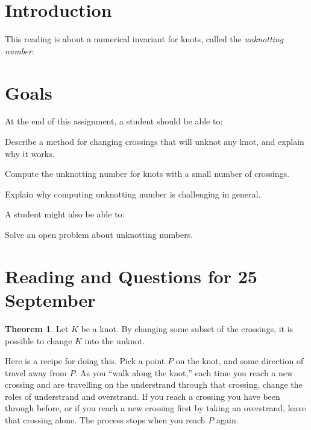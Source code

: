 \documentclass[12pt,letterpaper]{article}
\theoremstyle{definition}
\newtheorem*{theorem}{Theorem}
\begin{document}
\setlength{\parskip}{1ex plus 0.5ex minus 0.2ex}
\setlength{\parindent}{0pt}

\pagestyle{fancy}
\cfoot{}

\section*{Introduction}
This reading is about a numerical invariant for knots, called the \emph{unknotting number}.

\section*{Goals}
At the end of this assignment, a student should be able to:
\begin{compactitem}
\item Describe a method for changing crossings that will unknot any knot, and explain why it works.
\item Compute the unknotting number for knots with a small number of crossings.
\item Explain why computing unknotting number is challenging in general.
\end{compactitem}
A student might also be able to:
\begin{compactitem}
\item Solve an open problem about unknotting numbers.
\end{compactitem}

\section*{Reading and Questions for 25 September}

\begin{theorem}
Let $K$ be a knot.
By changing some subset of the crossings, it is possible to change $K$ into the unknot.
\end{theorem}

Here is a recipe for doing this.
Pick a point $P$ on the knot, and some direction of travel away from $P$.
As you ``walk along the knot,'' each time you reach a new crossing and are travelling on the understrand through that crossing, change the roles of understrand and overstrand.
If you reach a crossing you have been through before, or if you reach a new crossing first by taking an overstrand, leave that crossing alone.
The process stops when you reach $P$ again.
\end{document}
